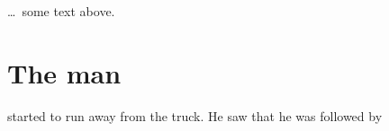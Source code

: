 \documentclass{article}
\begin{document}
  \ldots\ some text above.
  \section{The man}
  started to run away from the truck. He saw that
  he was followed by
\end{document}
